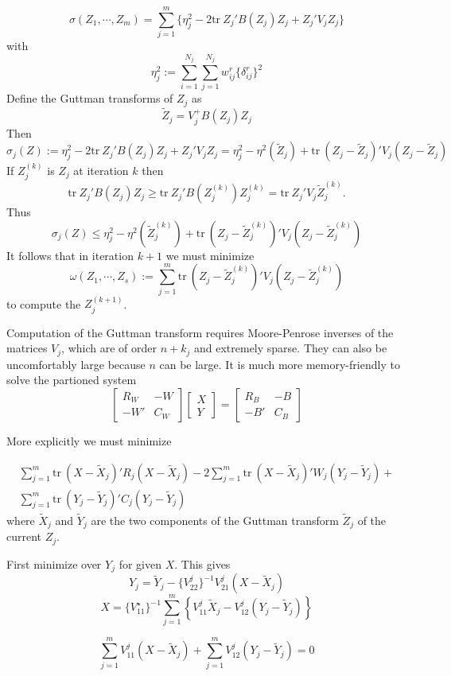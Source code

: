 \documentclass[
  12pt,
]{article}
\begin{document}
\[
\sigma(Z_1,\cdots,Z_m)=\sum_{j=1}^m\{\eta_j^2-2\text{tr}\ Z_j'B(Z_j)Z_j+Z_j'V_jZ_j\}
\]
with
\[
\eta_j^2:=\sum_{i=1}^{N_j}\sum_{j=1}^{N_j}w_{ij}^r\{\delta_{ij}^r\}^2
\]
Define the Guttman transforms of \(Z_j\) as
\[
\tilde Z_j=V_j^+B(Z_j)Z_j
\]
Then
\[
\sigma_j(Z):=\eta_j^2-2\text{tr}\ Z_j'B(Z_j)Z_j+Z_j'V_jZ_j=\eta_j^2-\eta^2(\tilde Z_j)+\text{tr}\ (Z_j-\tilde Z_j)'V_j(Z_j-\tilde Z_j)
\]
If \(Z_j^{(k)}\) is \(Z_j\) at iteration \(k\) then
\[
\text{tr}\ Z_j'B(Z_j)Z_j\geq\text{tr}\ Z_j'B(Z_j^{(k)})Z_j^{(k)}=\text{tr}\ Z_j'V_j\tilde Z_j^{(k)}.
\]
Thus
\[
\sigma_j(Z)\leq\eta_j^2-\eta^2(\tilde Z_j^{(k)})+\text{tr}\ (Z_j-\tilde Z_j^{(k)})'V_j(Z_j-\tilde Z_j^{(k)})
\]
It follows that in iteration \(k+1\) we must minimize
\[
\omega(Z_1,\cdots,Z_s):=\sum_{j=1}^m\text{tr}\ (Z_j-\tilde Z_j^{(k)})'V_j(Z_j-\tilde Z_j^{(k)})
\]
to compute the \(Z_j^{(k+1)}\).

Computation of the Guttman transform requires Moore-Penrose inverses of the
matrices \(V_j\), which are of order \(n+k_j\) and extremely sparse. They can also be uncomfortably large because \(n\) can be large. It is much more memory-friendly to solve the partioned system
\[
\begin{bmatrix}
R_W&-W\\
-W'&C_W
\end{bmatrix}
\begin{bmatrix}X\\Y\end{bmatrix}=\begin{bmatrix}
R_B&-B\\
-B'&C_B
\end{bmatrix}
\]

More explicitly we must minimize

\begin{multline}
\sum_{j=1}^m\text{tr}\ (X-\tilde X_j)'R_j(X-\tilde X_j)-2\sum_{j=1}^m\text{tr}\ (X-\tilde X_j)'W_j(Y_j-\tilde Y_j)+\\
\sum_{j=1}^m\text{tr}\ (Y_j-\tilde Y_j)'C_j(Y_j-\tilde Y_j)
\end{multline}
where \(\tilde X_j\) and \(\tilde Y_j\) are the two components of the Guttman
transform \(\tilde Z_j\) of the current \(Z_j\).

First minimize over \(Y_j\) for given \(X\). This gives
\[
Y_j=\tilde Y_j-\{V_{22}^j\}^{-1}V_{21}^j(X-\tilde X_j)
\]
\[
X = \{V_{11}^\star\}^{-1}\sum_{j=1}^m\left\{V_{11}^j\tilde X_j-V_{12}^j(Y_j-\tilde Y_j)\right\}
\]

\[
\sum_{j=1}^m V_{11}^j(X-\tilde X_j)+\sum_{j=1}^mV_{12}^j(Y_j-\tilde Y_j)= 0
\]
\end{document}
